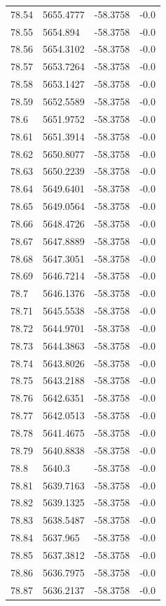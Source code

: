 \begin{table}[H]
\begin{tabular}{llll}
78.54 & 5655.4777 & -58.3758 & -0.0 \\
78.55 & 5654.894 & -58.3758 & -0.0 \\
78.56 & 5654.3102 & -58.3758 & -0.0 \\
78.57 & 5653.7264 & -58.3758 & -0.0 \\
78.58 & 5653.1427 & -58.3758 & -0.0 \\
78.59 & 5652.5589 & -58.3758 & -0.0 \\
78.6 & 5651.9752 & -58.3758 & -0.0 \\
78.61 & 5651.3914 & -58.3758 & -0.0 \\
78.62 & 5650.8077 & -58.3758 & -0.0 \\
78.63 & 5650.2239 & -58.3758 & -0.0 \\
78.64 & 5649.6401 & -58.3758 & -0.0 \\
78.65 & 5649.0564 & -58.3758 & -0.0 \\
78.66 & 5648.4726 & -58.3758 & -0.0 \\
78.67 & 5647.8889 & -58.3758 & -0.0 \\
78.68 & 5647.3051 & -58.3758 & -0.0 \\
78.69 & 5646.7214 & -58.3758 & -0.0 \\
78.7 & 5646.1376 & -58.3758 & -0.0 \\
78.71 & 5645.5538 & -58.3758 & -0.0 \\
78.72 & 5644.9701 & -58.3758 & -0.0 \\
78.73 & 5644.3863 & -58.3758 & -0.0 \\
78.74 & 5643.8026 & -58.3758 & -0.0 \\
78.75 & 5643.2188 & -58.3758 & -0.0 \\
78.76 & 5642.6351 & -58.3758 & -0.0 \\
78.77 & 5642.0513 & -58.3758 & -0.0 \\
78.78 & 5641.4675 & -58.3758 & -0.0 \\
78.79 & 5640.8838 & -58.3758 & -0.0 \\
78.8 & 5640.3 & -58.3758 & -0.0 \\
78.81 & 5639.7163 & -58.3758 & -0.0 \\
78.82 & 5639.1325 & -58.3758 & -0.0 \\
78.83 & 5638.5487 & -58.3758 & -0.0 \\
78.84 & 5637.965 & -58.3758 & -0.0 \\
78.85 & 5637.3812 & -58.3758 & -0.0 \\
78.86 & 5636.7975 & -58.3758 & -0.0 \\
78.87 & 5636.2137 & -58.3758 & -0.0 \\

\end{tabular}
\end{table}

